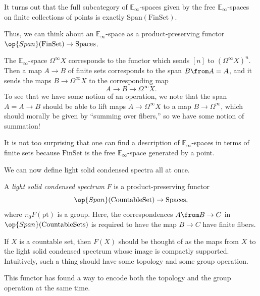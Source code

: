 \documentclass[../notes.tex]{subfiles}
\begin{document}
\begin{remark}[Segal]
	It turns out that the full subcategory of $\mathbb E_\infty$-spaces given by the free $\mathbb E_\infty$-spaces on finite collections of points is exactly $\mathrm{Span}(\mathrm{FinSet})$.
\end{remark}
Thus, we can think about an $\mathbb E_\infty$-space as a product-preserving functor $\op{Span}(\mathrm{FinSet})\to\mathrm{Spaces}$.
\begin{example}
	The $\mathbb E_\infty$-space $\Omega^\infty X$ corresponds to the functor which sends $[n]$ to $(\Omega^\infty X)^n$. Then a map $A\to B$ of finite sets corresponds to the span $B\from A=A$, and it sends the maps $B\to\Omega^\infty X$ to the corresponding map
	\[A\to B\to\Omega^\infty X.\]
	To see that we have some notion of an operation, we note that the span $A=A\to B$ should be able to lift maps $A\to\Omega^\infty X$ to a map $B\to\Omega^\infty$, which should morally be given by ``summing over fibers,'' so we have some notion of summation!
\end{example}
\begin{remark}
	It is not too surprising that one can find a description of $\mathbb E_\infty$-spaces in terms of finite sets because $\mathrm{FinSet}$ is the free $\mathbb E_\infty$-space generated by a point.
\end{remark}
We can now define light solid condensed spectra all at once.
\begin{definition}
	A \textit{light solid condensed spectrum} $F$ is a product-preserving functor
	\[\op{Span}(\mathrm{CountableSet})\to\mathrm{Spaces},\]
	where $\pi_0F(\mathrm{pt})$ is a group. Here, the correspondences $A\from B\to C$ in $\op{Span}(\mathrm{CountableSets})$ is required to have the map $B\to C$ have finite fibers.
\end{definition}
\begin{remark}
	If $X$ is a countable set, then $F(X)$ should be thought of as the maps from $X$ to the light solid condensed spectrum whose image is compactly supported. Intuitively, such a thing should have some topology and some group operation.
\end{remark}
\begin{remark}
	This functor has found a way to encode both the topology and the group operation at the same time.
\end{remark}
\end{document}
